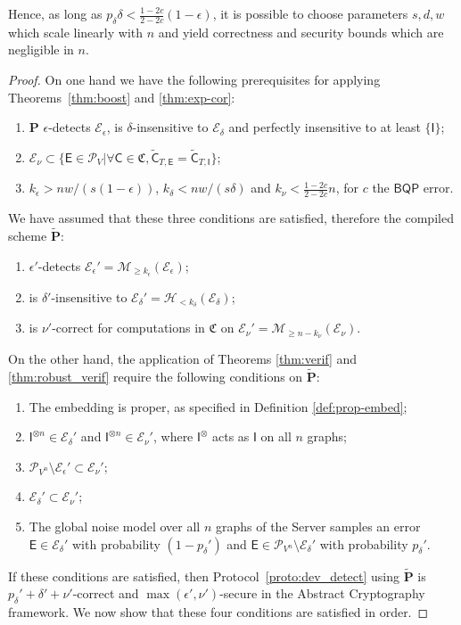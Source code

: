 \documentclass[12pt]{iopart}
\newcommand{\cptp}[1]{\mathsf{#1}} \newcommand{\pd}[1]{\mathcal{#1}}  \newcommand{\sch}[1]{\bm{#1}}
\newcommand{\Id}{\cptp{I}}
\renewcommand{\1}{\mathds{1}}
\newcommand{\Cdev}[1]{\tilde{\cptp C}_{T, #1}}
\begin{document}
Hence, as long as $p_\delta\delta < \frac{1 - 2c}{2 - 2c}(1 - \epsilon)$, it is possible to choose parameters $s, d, w$ which scale linearly with $n$ and yield correctness and security bounds which are negligible in $n$.

\begin{proof}
On one hand we have the following prerequisites for applying Theorems~\ref{thm:boost} and \ref{thm:exp-cor}:
\begin{enumerate}
\item $\sch P$ $\epsilon$-detects $\mathcal{E}_\epsilon$, is $\delta$-insensitive to $\mathcal{E}_\delta$ and perfectly insensitive to at least $\{\Id\}$;
\item $\mathcal{E}_\nu \subset \{\cptp E \in \mathcal{P}_V | \forall \cptp C \in \mathfrak{C}, \Cdev{\cptp E} = \Cdev{\cptp \Id}\}$;
\item $k_\epsilon > nw/(s(1-\epsilon))$, $k_\delta < nw/(s\delta)$ and $k_\nu < \frac{1 - 2c}{2 - 2c}n$, for $c$ the $\mathsf{BQP}$ error.
\end{enumerate}
We have assumed that these three conditions are satisfied, therefore the compiled scheme $\tilde{\sch P}$:
\begin{enumerate}
\item $\epsilon'$-detects $\mathcal{E}_\epsilon' = \mathcal{M}_{\geq k_\epsilon}(\mathcal E_\epsilon)$;
\item is $\delta'$-insensitive to $\mathcal{E}_\delta' = \mathcal{H}_{< k_\delta}(\mathcal E_\delta)$;
\item is $\nu'$-correct for computations in $\mathfrak{C}$ on $\mathcal{E}_\nu' = \mathcal{M}_{\geq n - k_\nu}(\mathcal E_\nu)$.
\end{enumerate}

On the other hand, the application of Theorems \ref{thm:verif} and \ref{thm:robust_verif} require the following conditions on $\tilde{\sch P}$:
\begin{enumerate}
\item The embedding is proper, as specified in Definition \ref{def:prop-embed};
\item $\Id^{\otimes n} \in \mathcal E_\delta'$ and $\Id^{\otimes n} \in \mathcal{E}_\nu'$, where $\Id^{\otimes}$ acts as $\Id$ on all $n$ graphs;
\item $\mathcal P_{V^n} \setminus \mathcal E_\epsilon' \subset \mathcal E_\nu'$;
\item $\mathcal{E}_\delta' \subset \mathcal{E}_\nu'$;
\item The global noise model over all $n$ graphs of the Server samples an error $\cptp E \in \mathcal E_\delta'$ with probability $(1-p_\delta')$ and $\cptp E \in \mathcal P_{V^n} \setminus \mathcal E_\delta'$ with probability $p_\delta'$.
\end{enumerate}
If these conditions are satisfied, then Protocol~\ref{proto:dev_detect} using $\tilde{\sch P}$ is $p_\delta' + \delta' + \nu'$-correct and $\max(\epsilon', \nu')$-secure in the Abstract Cryptography framework. We now show that these four conditions are satisfied in order.


\end{proof}
\end{document}
